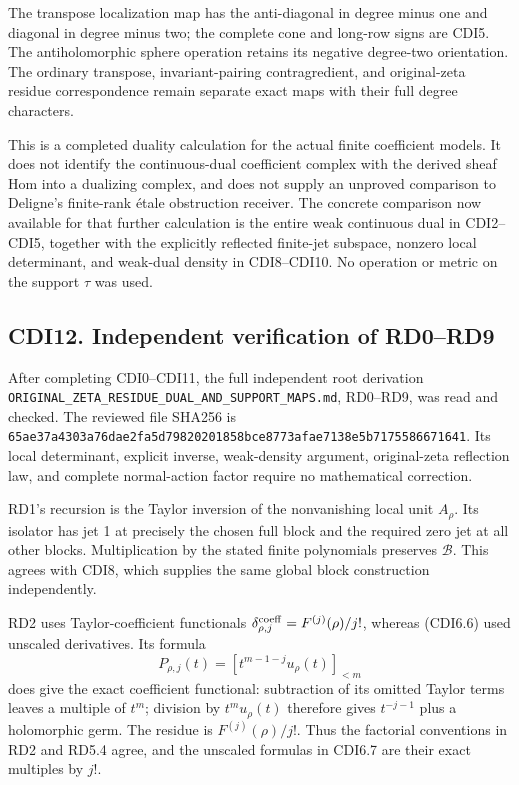 The transpose localization map has the anti-diagonal in degree minus one
and diagonal in degree minus two; the complete cone and long-row signs
are CDI5. The antiholomorphic sphere operation retains its negative
degree-two orientation. The ordinary transpose, invariant-pairing
contragredient, and original-zeta residue correspondence remain separate
exact maps with their full degree characters.

This is a completed duality calculation for the actual finite
coefficient models. It does not identify the continuous-dual coefficient
complex with the derived sheaf Hom into a dualizing complex, and does
not supply an unproved comparison to Deligne's finite-rank étale
obstruction receiver. The concrete comparison now available for that
further calculation is the entire weak continuous dual in CDI2--CDI5,
together with the explicitly reflected finite-jet subspace, nonzero
local determinant, and weak-dual density in CDI8--CDI10. No operation or
metric on the support \(\tau\) was used.

\subsection{CDI12. Independent verification of
RD0--RD9}\label{cdi12.-independent-verification-of-rd0rd9}

After completing CDI0--CDI11, the full independent root derivation
\nolinkurl{ORIGINAL_ZETA_RESIDUE_DUAL_AND_SUPPORT_MAPS.md}, RD0--RD9,
was read and checked. The reviewed file SHA256 is
\nolinkurl{65ae37a4303a76dae2fa5d79820201858bce8773afae7138e5b7175586671641}.
Its local determinant, explicit inverse, weak-density argument,
original-zeta reflection law, and complete normal-action factor require
no mathematical correction.

RD1's recursion is the Taylor inversion of the nonvanishing local unit
\(A_\rho\). Its isolator has jet 1 at precisely the chosen full block
and the required zero jet at all other blocks. Multiplication by the
stated finite polynomials preserves \(\mathcal B\). This agrees with
CDI8, which supplies the same global block construction independently.

RD2 uses Taylor-coefficient functionals
\(\delta_{\rho,j}^{\rm coeff}=F^{(j)}(\rho)/j!\), whereas (CDI6.6) used
unscaled derivatives. Its formula \[
P_{\rho,j}(t)=[t^{m-1-j}u_\rho(t)]_{<m}
\] does give the exact coefficient functional: subtraction of its
omitted Taylor terms leaves a multiple of \(t^m\); division by
\(t^m u_\rho(t)\) therefore gives \(t^{-j-1}\) plus a holomorphic germ.
The residue is \(F^{(j)}(\rho)/j!\). Thus the factorial conventions in
RD2 and RD5.4 agree, and the unscaled formulas in CDI6.7 are their exact
multiples by \(j!\).

